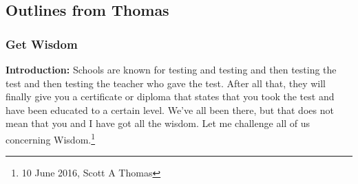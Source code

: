 \subsection{Outlines from Thomas}

\subsubsection{Get Wisdom}
\textbf{Introduction: }Schools are known for testing and testing and then testing the test and then testing the teacher who gave the test. After all that, they will finally give you a certificate or diploma that states that you took the test and have been educated to a certain level. We’ve all been there, but that does not mean that you and I have got all the wisdom. Let me challenge all of us concerning Wisdom.\footnote{10 June 2016, Scott A Thomas}


